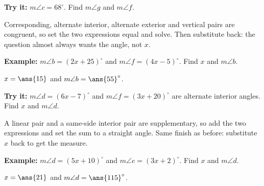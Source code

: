 \documentclass[12pt]{article}
\begin{document}
\begin{tryitbox}
\textbf{Try it:} $m\angle c = 68^\circ$. Find $m\angle g$ and $m\angle f$.\\[2pt]
\end{tryitbox}


\begin{formulabox}
Corresponding, alternate interior, alternate exterior and vertical pairs are
congruent, so set the two expressions equal and solve. Then substitute back:
the question almost always wants the angle, not $x$.
\end{formulabox}

\begin{examplebox}
\textbf{Example:} $m\angle b = (2x + 25)^\circ$ and $m\angle f = (4x - 5)^\circ$.
Find $x$ and $m\angle b$.

$x = \ans{15}$ and $m\angle b = \ans{55}^\circ$.
\end{examplebox}

\begin{tryitbox}
\textbf{Try it:} $m\angle d = (6x - 7)^\circ$ and $m\angle f = (3x + 20)^\circ$
are alternate interior angles. Find $x$ and $m\angle d$.\\[2pt]
\end{tryitbox}


\begin{formulabox}
A linear pair and a same-side interior pair are supplementary, so add the two
expressions and set the sum to a straight angle. Same finish as before:
substitute $x$ back to get the measure.
\end{formulabox}

\begin{examplebox}
\textbf{Example:} $m\angle d = (5x + 10)^\circ$ and $m\angle e = (3x + 2)^\circ$.
Find $x$ and $m\angle d$.

$x = \ans{21}$ and $m\angle d = \ans{115}^\circ$.
\end{examplebox}
\end{document}

